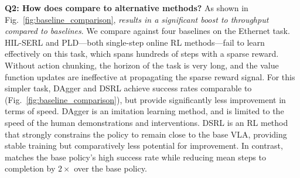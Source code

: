 \textbf{Q2: How does \MethodName{} compare to alternative methods?}
As shown in Fig.~\ref{fig:baseline_comparison}, \emph{\MethodName{} results in a significant boost to throughput compared to baselines}. We compare against four baselines on the Ethernet task. HIL-SERL and PLD---both single-step online RL methods---fail to learn effectively on this task, which spans hundreds of steps with a sparse reward. Without action chunking, the horizon of the task is very long, and the value function updates are ineffective at propagating the sparse reward signal. For this simpler task, DAgger and DSRL achieve success rates comparable to \MethodName{} (Fig.~\ref{fig:baseline_comparison}), but provide significantly less improvement in terms of speed. DAgger is an imitation learning method, and is limited to the speed of the human demonstrations and interventions. DSRL is an RL method that strongly constrains the policy to remain close to the base VLA, providing stable training but comparatively less potential for improvement.  In contrast, \MethodName{} matches the base policy's high success rate while reducing mean steps to completion by $2{\times}$ over the base policy.

